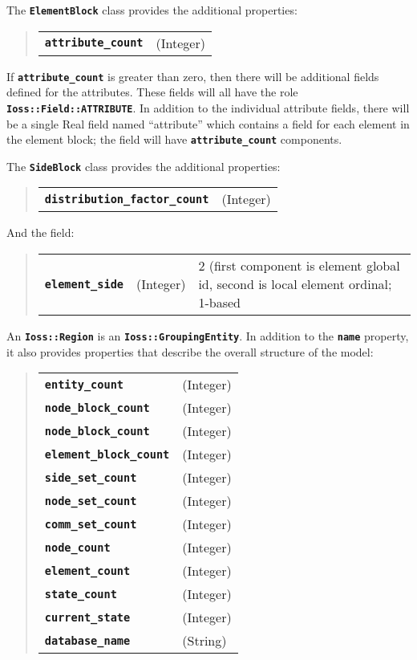 \documentclass[11pt,twoside]{article}
\newcommand{\code}[1]
   {\mbox{\bf\tt #1}\null}
\begin{document}
The \code{ElementBlock} class provides the additional properties:
\begin{quote}
\begin{tabular}{ll}
\code{attribute\_count}     &(Integer) \\
\end{tabular}
\end{quote}
If \code{attribute\_count} is greater than zero, then there will be
additional fields defined for the attributes.  These fields will all
have the role \code{Ioss::Field::ATTRIBUTE}. In addition to the
individual attribute fields, there will be a single Real field named
``attribute'' which contains a field for each element in the element
block; the field will have \code{attribute\_count} components.

The \code{SideBlock} class provides the additional properties:
\begin{quote}
\begin{tabular}{ll}
\code{distribution\_factor\_count}     &(Integer) \\
\end{tabular}
\end{quote}
And the field:
\begin{quote}
\begin{tabular}{lll}
\code{element\_side}     &(Integer) & 2 (first component is element
global id, second is local element ordinal; 1-based \\
\end{tabular}
\end{quote}

An \code{Ioss::Region} is an \code{Ioss::GroupingEntity}. In addition
to the \code{name} property, it also provides properties that describe
the overall structure of the model:
\begin{quote}
\begin{tabular}{ll}
\code{entity\_count} 	   &(Integer) \\
\code{node\_block\_count}  &(Integer) \\
\code{node\_block\_count}    &(Integer) \\
\code{element\_block\_count} &(Integer) \\
\code{side\_set\_count}      &(Integer) \\
\code{node\_set\_count}      &(Integer) \\
\code{comm\_set\_count}      &(Integer) \\
\code{node\_count}          &(Integer) \\
\code{element\_count}       &(Integer) \\
\code{state\_count}         &(Integer) \\
\code{current\_state}       &(Integer) \\
\code{database\_name}       &(String)  \\
\end{tabular}
\end{quote}
\end{document}
